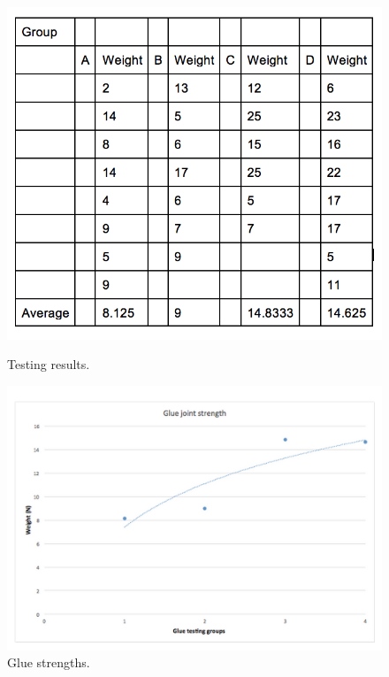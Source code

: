 \documentclass[12pt]{article}
\begin{document}
                \begin{figure}[ht]
                 	\centering
			\begin{minipage}[b]{0.35\linewidth}
			\includegraphics[width=1\textwidth]{GlueResults}
			\caption{Testing results.}
			\label{tab}
		\end{minipage}
		\quad
	\begin{minipage}[b]{0.35\linewidth}
			\includegraphics[width=1.2\textwidth]{GlueGraphlegit}
			\caption{Glue strengths.}
			\label{graphs}
		\end{minipage}
		\end{figure}
                
\end{document}
